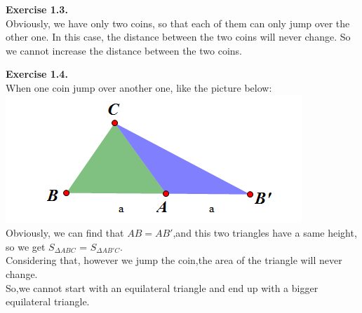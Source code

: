\documentclass{article}
\begin{document}
\begin{flushleft}
\textbf{Exercise 1.3.} \\
Obviously, we have only two coins, so that each of them can only jump over the other one.
In this case, the distance between the two coins will never change. So we cannot increase the 
distance between the two coins.

\textbf{Exercise 1.4.} \\
When one coin jump over another one, like the picture below:
\includegraphics[scale=0.7]{1_4_1.png}\\
Obviously, we can find that $AB = AB'$,and this two triangles have a same height, so we get  $S_{\Delta ABC}$ = $S_{\Delta AB'C}$.\\
Considering that, however we jump the coin,the area of the triangle will never change.\\
So,we cannot start with an equilateral triangle and end up with a bigger equilateral triangle.


\end{flushleft}
\end{document}
